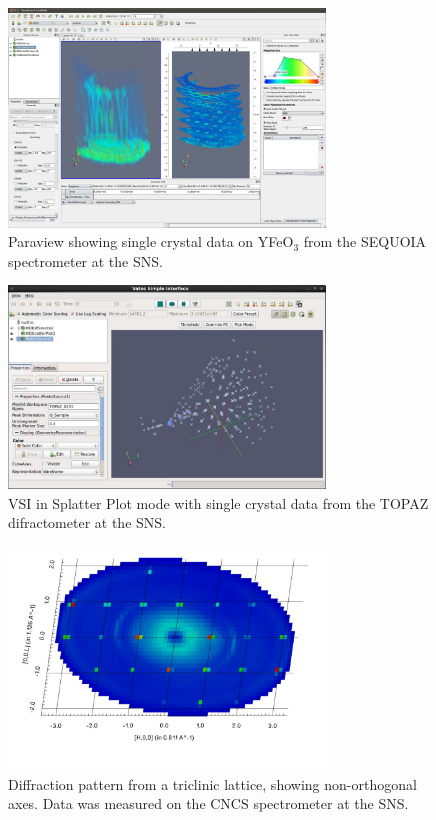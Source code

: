 \documentclass[1p]{elsarticle}
\begin{document}
\begin{figure}[ht]
\centerline{\includegraphics[width=0.75\textwidth]{ParaviewYFeO3.pdf}}
\caption{Paraview showing single crystal data\cite{YFeO3} on YFeO$_3$ from the SEQUOIA spectrometer at the SNS.}
\label{fig:PV}
\end{figure}

\begin{figure}[!ht]
\centerline{\includegraphics[width=0.75\textwidth]{VSISplatterPlot.pdf}}
\caption{VSI in Splatter Plot mode with single crystal data from the TOPAZ difractometer at the SNS.}
\label{fig:VSI_sample}
\end{figure}

\begin{figure}[!ht]
\centerline{\includegraphics[width=0.75\textwidth]{NonOrthogonal.pdf}}
\caption{Diffraction pattern from a triclinic lattice, showing non-orthogonal axes. Data was measured on the CNCS spectrometer at the SNS.}
\label{fig:ParaView_sample}
\end{figure}
\end{document}
